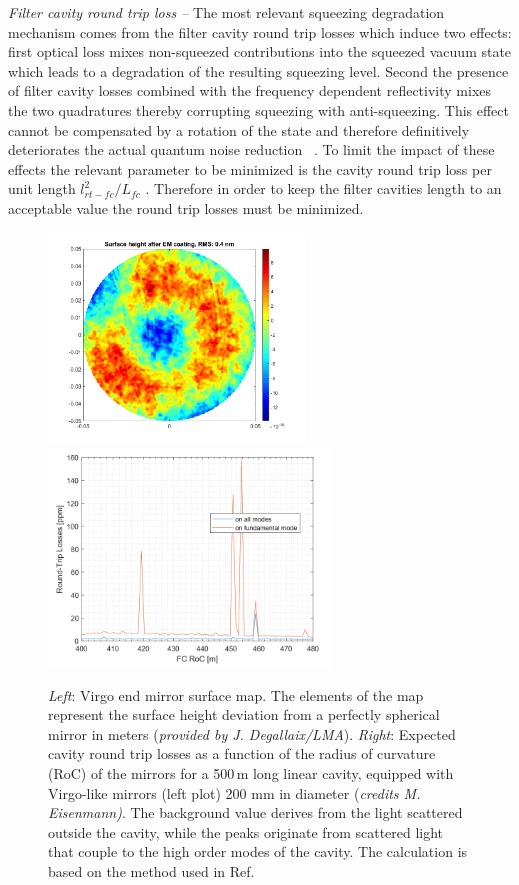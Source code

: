 \textit{Filter cavity round trip loss --} The most relevant squeezing degradation mechanism comes from the filter cavity round trip losses which induce two effects: first optical loss mixes non-squeezed contributions into the squeezed vacuum state which leads to a degradation of the resulting squeezing level. Second the presence of filter cavity losses combined with the frequency dependent reflectivity mixes the two quadratures thereby corrupting squeezing with anti-squeezing. This effect cannot be compensated by a rotation of the state and therefore definitively deteriorates the actual quantum noise reduction ~\citep{Kwee2014}. To limit the impact of these effects the relevant parameter to be minimized is the cavity round trip loss per unit length $l^2_{rt-fc}/L_{fc}$ \cite{Khalili2010}. Therefore in order to keep the filter cavities length to an acceptable value the round trip losses must be minimized. 
% 
\begin{figure}%
\centering
\includegraphics[width=68mm]{./Detector/DetFigures/Mirror_Map.png} 
\includegraphics[width=75mm]{./Detector/DetFigures/FC_Stray.png}
\caption{{\it Left}: Virgo end  mirror surface map. The elements of the map represent the surface height deviation from a perfectly spherical mirror in meters ({\it provided by J. Degallaix/LMA}). {\it Right}: Expected cavity round trip losses as a function of the radius of curvature (RoC) of the mirrors for a 500\,m long linear cavity, equipped with Virgo-like mirrors (left plot) 200 mm in diameter ({\it credits M. Eisenmann)}. The background value derives from the light scattered outside the cavity, while the peaks originate from scattered light that couple to the high order modes of the cavity. The calculation is based on the method used in Ref.\citep{Capocasa2016} }
\label{fig:FC_rt_strain}
\end{figure}
